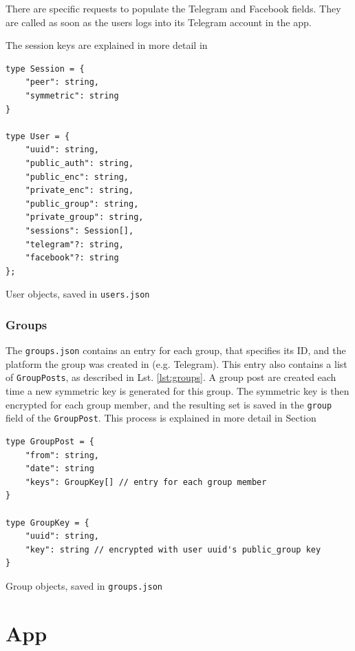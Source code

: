 \documentclass[a4paper, oneside]{discothesis}
\begin{document}
There are specific requests to populate the Telegram and Facebook fields. They are called as soon as the users logs into its Telegram account in the app.

The session keys are explained in more detail in 


\begin{listing}[h!]
\label{lst:users}
\begin{verbatim}
type Session = {
    "peer": string,
    "symmetric": string
}

type User = {
    "uuid": string,
    "public_auth": string,
    "public_enc": string,
    "private_enc": string,
    "public_group": string,
    "private_group": string,
    "sessions": Session[],
    "telegram"?: string,
    "facebook"?: string
};
\end{verbatim}
\caption{User objects, saved in \texttt{users.json}}
\end{listing}

\subsubsection{Groups}
\label{sec:group_keys}

The \texttt{groups.json} contains an entry for each group, that specifies its ID, and the platform the group was created in (e.g. Telegram). This entry also contains a list of \texttt{GroupPosts}, as described in Lst. \ref{lst:groups}. A group post are created each time a new symmetric key is generated for this group. The symmetric key is then encrypted for each group member, and the resulting set is saved in the \texttt{group} field of the \texttt{GroupPost}. This process is explained in more detail in Section 

\begin{listing}[h!]
\label{lst:groups}
\begin{verbatim}
type GroupPost = {
    "from": string,
    "date": string
    "keys": GroupKey[] // entry for each group member
}

type GroupKey = {
    "uuid": string,
    "key": string // encrypted with user uuid's public_group key
}
\end{verbatim}
\caption{Group objects, saved in \texttt{groups.json}}
\end{listing}

\section{App}
\end{document}
